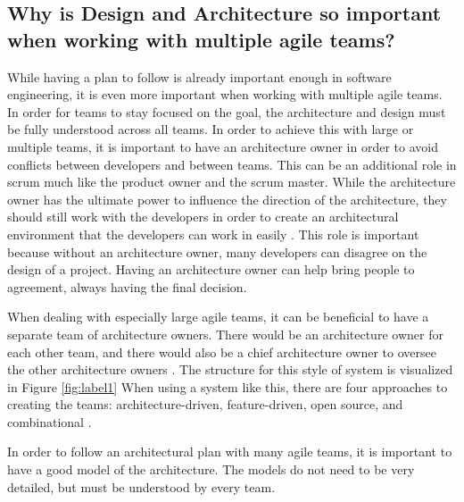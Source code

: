\documentclass[sigplan,screen]{acmart}
\begin{document}
\subsection{Why is Design and Architecture so important when working with multiple agile teams?}
While having a plan to follow is already important enough in software engineering, it is even more important when working with multiple agile teams. In order for teams to stay focused on the goal, the architecture and design must be fully understood across all teams.
In order to achieve this with large or multiple teams, it is important to have an architecture owner in order to avoid conflicts between developers and between teams. This can be an additional role in scrum much like the product owner and the scrum master. While the architecture owner has the ultimate power to influence the direction of the architecture, they should still work with the developers in order to create an architectural environment that the developers can work in easily \cite{WAmbler}. This role is important because without an architecture owner, many developers can disagree on the design of a project. Having an architecture owner can help bring people to agreement, always having the final decision. \par
When dealing with especially large agile teams, it can be beneficial to have a separate team of architecture owners. There would be an architecture owner for each other team, and there would also be a chief architecture owner to oversee the other architecture owners \cite{WAmbler}. The structure for this style of system is visualized in Figure \ref{fig:label1} When using a system like this, there are four approaches to creating the teams: architecture-driven, feature-driven, open source, and combinational \cite{WAmbler}. \par
In order to follow an architectural plan with many agile teams, it is important to have a good model of the architecture. The models do not need to be very detailed, but must be understood by every team.
\end{document}
